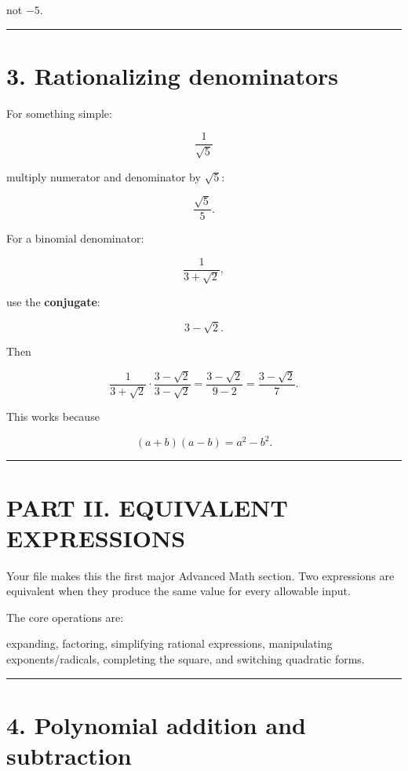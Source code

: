 \documentclass[
]{article}
\begin{document}
not \(-5\).

\begin{center}\rule{0.5\linewidth}{0.5pt}\end{center}

\section{3. Rationalizing
denominators}\label{rationalizing-denominators}

For something simple:

\[
\frac1{\sqrt 5}
\]

multiply numerator and denominator by \(\sqrt5\):

\[
\frac{\sqrt5}{5}.
\]

For a binomial denominator:

\[
\frac1{3+\sqrt2},
\]

use the \textbf{conjugate}:

\[
3-\sqrt2.
\]

Then

\[
\frac{1}{3+\sqrt2}
\cdot
\frac{3-\sqrt2}{3-\sqrt2}
=
\frac{3-\sqrt2}{9-2}
=
\frac{3-\sqrt2}{7}.
\]

This works because

\[
(a+b)(a-b)=a^2-b^2.
\]

\begin{center}\rule{0.5\linewidth}{0.5pt}\end{center}

\section{PART II. EQUIVALENT
EXPRESSIONS}\label{part-ii.-equivalent-expressions}

Your file makes this the first major Advanced Math section. Two
expressions are equivalent when they produce the same value for every
allowable input.

The core operations are:

expanding, factoring, simplifying rational expressions, manipulating
exponents/radicals, completing the square, and switching quadratic
forms.

\begin{center}\rule{0.5\linewidth}{0.5pt}\end{center}

\section{4. Polynomial addition and
subtraction}\label{polynomial-addition-and-subtraction}
\end{document}
